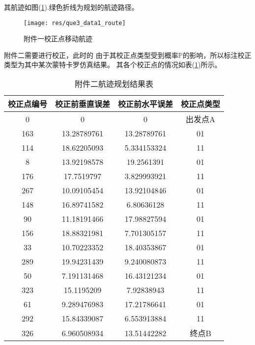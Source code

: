 其航迹如图(\ref{fig:res-qu3-1}).\figcolor 绿色折线为规划的航迹路径。
\begin{figure}[htbp!]
    \centering
    \texttt{[image: res/que3\_data1\_route]}
    \caption{附件一校正点移动航迹}
    \label{fig:res-qu3-1}
\end{figure}

附件二需要进行校正，此时的
由于其校正点类型受到概率$\mathbb{P} $的影响，所以标注校正类型为其中某次蒙特卡罗仿真结果。
其各个校正点的情况如表(\ref{tab:res-qu3-2})所示。 
\begin{table}[!htbp]
	\caption{附件二航迹规划结果表} 
	\label{tab:res-qu3-2}
	\centering
	\begin{tabular}{cccc} 
		\toprule[1.5pt] 
        校正点编号 & 校正前垂直误差 & 校正前水平误差 & 校正点类型 \\
		\midrule[1pt] 
        0     & 0     & 0     & 出发点A \\
        163   & 13.28789761 & 13.28789761 & \multicolumn{1}{c}{01} \\
        114   & 18.62205093 & 5.334153324 & \multicolumn{1}{c}{11} \\
        8     & 13.92198578 & 19.2561391 & \multicolumn{1}{c}{01} \\
        176   & 17.7519797 & 3.829993921 & \multicolumn{1}{c}{11} \\
        267   & 10.09105454 & 13.92104846 & \multicolumn{1}{c}{01} \\
        148   & 16.89741582 & 6.80636128 & \multicolumn{1}{c}{11} \\
        90    & 11.18191466 & 17.98827594 & \multicolumn{1}{c}{01} \\
        156   & 18.88321981 & 7.701305157 & \multicolumn{1}{c}{11} \\
        33    & 10.70223352 & 18.40353867 & \multicolumn{1}{c}{01} \\
        289   & 19.94231439 & 9.240080873 & \multicolumn{1}{c}{11} \\
        50    & 7.191131468 & 16.43121234 & \multicolumn{1}{c}{01} \\
        323   & 15.1195209 & 7.92838943 & \multicolumn{1}{c}{11} \\
        61    & 9.289476983 & 17.21786641 & \multicolumn{1}{c}{01} \\
        292   & 15.84339087 & 6.553913884 & \multicolumn{1}{c}{11} \\
        326   & 6.960508934 & 13.51442282 & 终点B \\
		\bottomrule[1.5pt] 
\end{tabular}\end{table}

